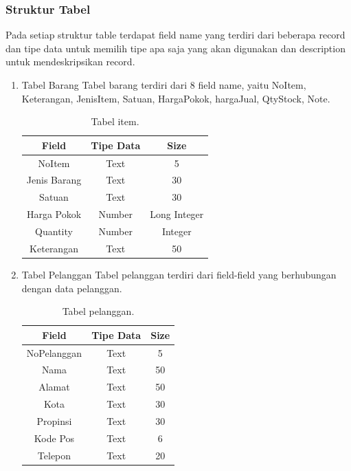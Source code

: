 \documentclass{article}
\begin{document}
\subsubsection{Struktur Tabel}
Pada setiap struktur table terdapat field name yang terdiri dari beberapa record dan tipe data untuk memilih tipe apa saja yang akan digunakan dan description untuk mendeskripsikan record.
\begin{enumerate}
    \item Tabel Barang \newline
    Tabel barang terdiri dari 8 field name, yaitu NoItem, Keterangan, JenisItem, Satuan, HargaPokok, hargaJual, QtyStock, Note.
    \begin{table}[h!]
    \centering
    \begin{tabular}{||c c c ||} 
     \hline
     Field & Tipe Data & Size \\ [0.5ex] 
     \hline\hline
    NoItem & Text & 5 \\
    Jenis Barang & Text & 30 \\
    Satuan & Text & 30 \\
    Harga Pokok & Number & Long Integer\\	
    Quantity & Number & Integer\\
    Keterangan & Text & 50 \\ [1ex]
     \hline
    \end{tabular}
    \caption{Tabel item.}
    \label{table:4}
    \end{table}
    \newpage
    \item Tabel Pelanggan \newline
    Tabel pelanggan terdiri dari field-field yang berhubungan dengan data pelanggan.
\begin{table}[h!]
\centering
\begin{tabular}{||c c c ||} 
 \hline
 Field & Tipe Data & Size \\ [0.5ex] 
 \hline\hline
NoPelanggan & Text & 5 \\
Nama & Text & 50 \\
Alamat & Text & 50 \\
Kota & Text & 30 \\
Propinsi & Text & 30 \\
Kode Pos & Text & 6 \\
Telepon & Text & 20 \\ [1ex]
 \hline
\end{tabular}
\caption{Tabel pelanggan.}
\label{table:5}
\end{table}

\end{enumerate}
\end{document}
